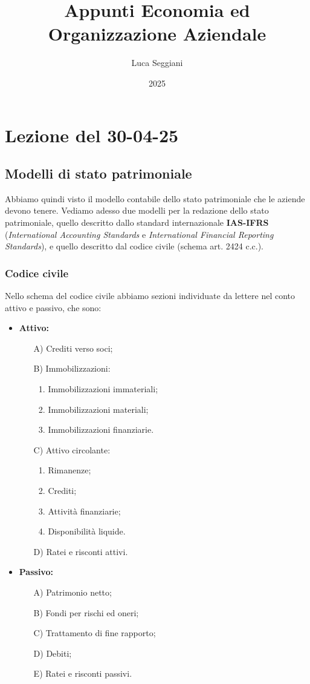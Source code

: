 \documentclass[a4paper,11pt]{article}
\title{Appunti Economia ed Organizzazione Aziendale}
\author{Luca Seggiani}
\date{2025}
\begin{document}
\section{Lezione del 30-04-25}

\thispagestyle{empty}
\pagestyle{fancy}

\subsection{Modelli di stato patrimoniale}
Abbiamo quindi visto il modello contabile dello stato patrimoniale che le aziende devono tenere.
Vediamo adesso due modelli per la redazione dello stato patrimoniale, quello descritto dallo standard internazionale \textbf{IAS-IFRS} (\textit{International Accounting Standards} e \textit{International Financial Reporting Standards}), e quello descritto dal codice civile (schema art. 2424 c.c.).

\subsubsection{Codice civile}
Nello schema del codice civile abbiamo sezioni individuate da lettere nel conto attivo e passivo, che sono:
\begin{itemize}
	\item \textbf{Attivo:}
		\begin{itemize}
			\item[A)] Crediti verso soci; 
			\item[B)] Immobilizzazioni:
				\begin{enumerate}
					\item Immobilizzazioni immateriali;
					\item Immobilizzazioni materiali;
					\item Immobilizzazioni finanziarie.
				\end{enumerate}
			\item[C)] Attivo circolante:
				\begin{enumerate}
					\item Rimanenze;
					\item Crediti;
					\item Attività finanziarie;
					\item Disponibilità liquide.
				\end{enumerate}
			\item[D)] Ratei e risconti attivi.
		\end{itemize}
	\item \textbf{Passivo:}
		\begin{itemize}
			\item[A)] Patrimonio netto;
			\item[B)] Fondi per rischi ed oneri;
			\item[C)] Trattamento di fine rapporto;
			\item[D)] Debiti;
			\item[E)] Ratei e risconti passivi.
		\end{itemize}
\end{itemize}
\end{document}
